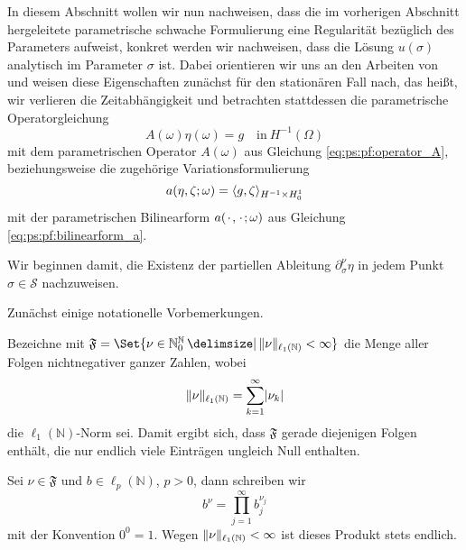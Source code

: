 In diesem Abschnitt wollen wir nun nachweisen, dass die im vorherigen Abschnitt hergeleitete parametrische schwache Formulierung eine Regularität bezüglich des Parameters aufweist, konkret werden wir nachweisen, dass die Lösung $u(\sigma)$ analytisch im Parameter $\sigma$ ist.
Dabei orientieren wir uns an den Arbeiten von \textcite{Cohen:2010kz,Kunoth:2013ef} und weisen diese Eigenschaften zunächst für den stationären Fall nach, das heißt, wir verlieren die Zeitabhängigkeit und betrachten stattdessen die parametrische Operatorgleichung
\begin{equation}
\label{eq:ps:rg:operatorgleichung_parametrisch}
    A(\omega) \eta(\omega) = g \quad \text{in}~H^{-1}(\Omega)
\end{equation}
mit dem parametrischen Operator $A(\omega)$ aus Gleichung \cref{eq:ps:pf:operator_A}, beziehungsweise die zugehörige Variationsformulierung
\begin{equation}
\label{eq:ps:rg:variationsformulierung_parametrisch}
    a(\eta, \zeta; \omega) = \langle g,\zeta\rangle_{H^{-1} \times H^{1}_{0}}
\end{equation}
mit der parametrischen Bilinearform $a({\mkern2mu\cdot\mkern2mu}, {\mkern2mu\cdot\mkern2mu}; \omega)$ aus Gleichung \cref{eq:ps:pf:bilinearform_a}.

Wir beginnen damit, die Existenz der partiellen Ableitung $\partial^{\nu}_{\sigma} \eta$ in jedem Punkt $\sigma \in \mathcal S$ nachzuweisen.

Zunächst einige notationelle Vorbemerkungen.
\begin{Bemerkung}
    Bezeichne mit $\mathfrak F = \Set{ \nu \in \mathbb{N}^{\mathbb{N}}_{0} \given \norm{\nu}_{\ell_{1}(\mathbb{N})} < \infty }$ die Menge aller Folgen nichtnegativer ganzer Zahlen, wobei
    \begin{equation}
        \lVert\nu\rVert_{\ell_{1}(\mathbb{N})} = \sum_{k = 1}^{\infty} \lvert\nu_{k}\rvert
    \end{equation}
    die $\ell_{1}(\mathbb{N})$-Norm sei.
    Damit ergibt sich, dass $\mathfrak F$ gerade diejenigen Folgen enthält, die nur endlich viele Einträgen ungleich Null enthalten.

    Sei $\nu \in \mathfrak F$ und $b \in \ell_{p}(\mathbb{N})$, $p > 0$, dann schreiben wir
    \begin{equation}
        b^{\nu} = \prod_{j = 1}^{\infty} b_{j}^{\nu_{j}}
    \end{equation}
    mit der Konvention $0^{0} = 1$.
    Wegen $\lVert\nu\rVert_{\ell_{1}(\mathbb{N})} < \infty$ ist dieses Produkt stets endlich.
\end{Bemerkung}

